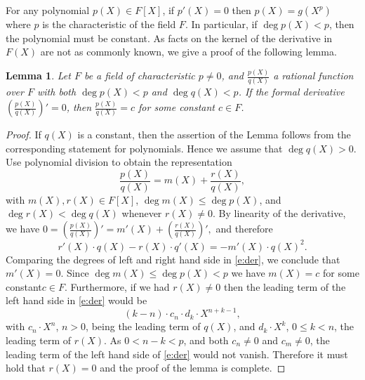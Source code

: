 \documentclass[11pt]{article}
\newtheorem{lem}[]{Lemma}
\theoremstyle{definition}
\theoremstyle{remark}
\begin{document}
For any polynomial $p(X)\in F[X]$, if $p'(X)=0$ then $p(X)= g(X^p)$ where $p$ is the characteristic of the field $F$.
In particular, if $\deg p(X) < p$, then the polynomial must be constant.
As facts on the kernel of the derivative in $F(X)$ are not as commonly known, we give a proof of the following lemma.

\begin{lem}
\label{lem:DerivativeFraction}
Let  $F$ be a field of characteristic $p\neq 0$, and $\frac{p(X)}{q(X)}$ a rational function over $F$ with both  $\deg p(X) < p$ and $\deg q(X) < p$.
If the formal derivative $\left(\frac{p(X)}{q(X)}\right)' = 0$, then $\frac{p(X)}{q(X)} = c$ for some constant $c\in F$.
\end{lem}

\begin{proof}
If $q(X)$ is a constant, then the assertion of the Lemma follows from the corresponding statement for polynomials.
Hence we assume that $\deg q(X)>0$.
Use polynomial division to obtain the representation
\[
\frac{p(X)}{q(X)} = m(X) + \frac{r(X)}{q(X)},
\]
with $m(X), r(X) \in F[X]$, $\deg m(X) \leq \deg p(X)$, and $\deg r(X) < \deg q(X)$ whenever $r(X)\neq 0$.
By linearity of the derivative, we have
$
0 =  \left(\frac{p(X)}{q(X)}\right)' = m'(X) + \left(\frac{r(X)}{q(X)}\right)',
$
and therefore
\begin{equation}
\label{e:der}
r'(X)\cdot q(X) - r(X)\cdot q'(X) = - m'(X)\cdot q(X)^2.
\end{equation}
Comparing the degrees of left and right hand side in \eqref{e:der}, we conclude that  $m'(X) = 0$.
Since $\deg m(X) \leq  \deg p(X) < p$ we have $m(X)= c$ for some constant\footnotemark $c\in F$. 
% 
Furthermore, if we had $r(X)\neq 0$ then the leading term of the left hand side in \eqref{e:der} would be
\[
(k - n) \cdot c_n\cdot d_{k} \cdot X^{n + k - 1},
\]
with $c_n \cdot X^n$, $n>0$, being the leading term of $q(X)$, and  $d_k \cdot X^k$, $0\leq k < n$, the leading term of $r(X)$.
As  $0 < n - k < p$, and both $c_n\neq 0$ and $c_m\neq 0$, the leading term of the left hand side of \eqref{e:der} would not vanish.
Therefore it must hold that  $r(X) = 0$ and the proof of the lemma is complete.
\end{proof}
\end{document}

